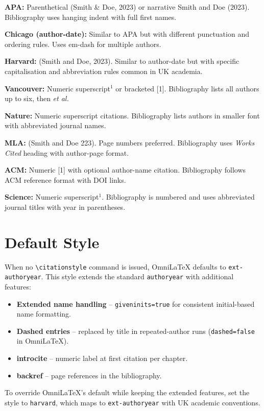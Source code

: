 \textbf{APA:} Parenthetical (Smith \& Doe, 2023) or narrative Smith and Doe
(2023). Bibliography uses hanging indent with full first names.

\textbf{Chicago (author-date):} Similar to APA but with different punctuation
and ordering rules. Uses em-dash for multiple authors.

\textbf{Harvard:} (Smith and Doe, 2023). Similar to author-date but with
specific capitalisation and abbreviation rules common in UK academia.

\textbf{Vancouver:} Numeric superscript$^{1}$ or bracketed [1]. Bibliography
lists all authors up to six, then \emph{et al.}

\textbf{Nature:} Numeric superscript citations. Bibliography lists authors in
smaller font with abbreviated journal names.

\textbf{MLA:} (Smith and Doe 223). Page numbers preferred. Bibliography uses
\emph{Works Cited} heading with author-page format.

\textbf{ACM:} Numeric [1] with optional author-name citation. Bibliography
follows ACM reference format with DOI links.

\textbf{Science:} Numeric superscript$^{1}$. Bibliography is numbered and
uses abbreviated journal titles with year in parentheses.

\section{Default Style}

When no \verb|\citationstyle| command is issued, OmniLaTeX defaults to
\texttt{ext-authoryear}. This style extends the standard \texttt{authoryear}
with additional features:

\begin{itemize}
    \item \textbf{Extended name handling} -- \texttt{giveninits=true} for
          consistent initial-based name formatting.
    \item \textbf{Dashed entries} -- replaced by title in repeated-author
          runs (\texttt{dashed=false} in OmniLaTeX).
    \item \textbf{introcite} -- numeric label at first citation per chapter.
    \item \textbf{backref} -- page references in the bibliography.
\end{itemize}

To override OmniLaTeX's default while keeping the extended features, set the
style to \texttt{harvard}, which maps to \texttt{ext-authoryear} with UK
academic conventions.
